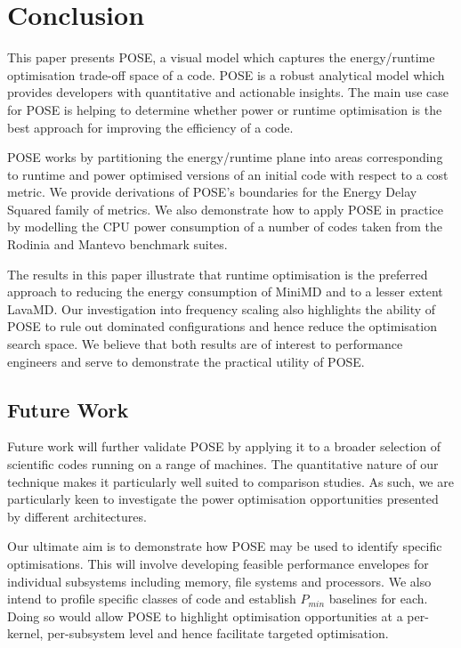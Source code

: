\section{Conclusion}
\label{sec:conclusion}
This paper presents POSE, a visual model which captures the energy/runtime optimisation trade-off space of a code.
POSE is a robust analytical model which provides developers with quantitative and actionable insights.
The main use case for POSE is helping to determine whether power or runtime optimisation is the best approach for improving the efficiency of a code.

POSE works by partitioning the energy/runtime plane into areas corresponding to runtime and power optimised versions of an initial code with respect to a cost metric.
We provide derivations of POSE's boundaries for the Energy Delay Squared family of metrics.
We also demonstrate how to apply POSE in practice by modelling the CPU power consumption of a number of codes taken from the Rodinia and Mantevo benchmark suites.  

The results in this paper illustrate that runtime optimisation is the preferred approach to reducing the energy consumption of MiniMD and to a lesser extent LavaMD.
Our investigation into frequency scaling also highlights the ability of POSE to rule out dominated configurations and hence reduce the optimisation search space.
We believe that both results are of interest to performance engineers and serve to demonstrate the practical utility of POSE.

\subsection{Future Work}
Future work will further validate POSE by applying it to a broader selection of scientific codes running on a range of machines.
The quantitative nature of our technique makes it particularly well suited to comparison studies.
As such, we are particularly keen to investigate the power optimisation opportunities presented by different architectures.

Our ultimate aim is to demonstrate how POSE may be used to identify specific optimisations.
This will involve developing feasible performance envelopes for individual subsystems including memory, file systems and processors. 
We also intend to profile specific classes of code and establish $P_{min}$ baselines for each.
Doing so would allow POSE to highlight optimisation opportunities at a per-kernel, per-subsystem level and hence facilitate targeted optimisation.
